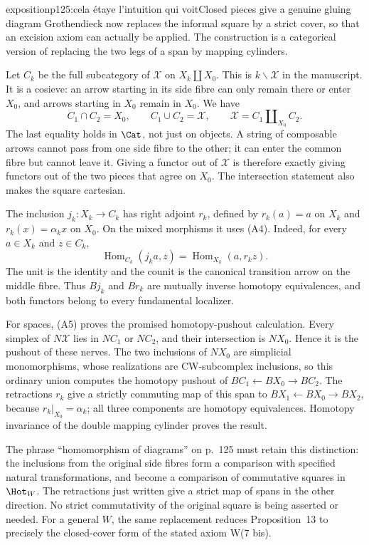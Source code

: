 \begin{dcomment}{exposition}{p125:cela étaye l'intuition qui voit}{Closed pieces give a genuine gluing diagram}
Grothendieck now replaces the informal square by a strict cover, so that an excision axiom can actually be applied.  The construction is a categorical version of replacing the two legs of a span by mapping cylinders.

Let $C_k$ be the full subcategory of $\mathcal X$ on $X_k\amalg X_0$.  This is $k\backslash\mathcal X$ in the manuscript.  It is a cosieve: an arrow starting in its side fibre can only remain there or enter $X_0$, and arrows starting in $X_0$ remain in $X_0$.  We have
\[
 C_1\cap C_2=X_0,\qquad C_1\cup C_2=\mathcal X,
 \qquad \mathcal X=C_1\amalg_{X_0}C_2.
 \tag{A5}
\]
The last equality holds in $\Cat$, not just on objects.  A string of composable arrows cannot pass from one side fibre to the other; it can enter the common fibre but cannot leave it.  Giving a functor out of $\mathcal X$ is therefore exactly giving functors out of the two pieces that agree on $X_0$.  The intersection statement also makes the square cartesian.

The inclusion $j_k:X_k\to C_k$ has right adjoint $r_k$, defined by $r_k(a)=a$ on $X_k$ and $r_k(x)=\alpha_kx$ on $X_0$.  On the mixed morphisms it uses (A4).  Indeed, for every $a\in X_k$ and $z\in C_k$,
\[
 \operatorname{Hom}_{C_k}(j_ka,z)
       =\operatorname{Hom}_{X_k}(a,r_kz).
\]
The unit is the identity and the counit is the canonical transition arrow on the middle fibre.  Thus $Bj_k$ and $Br_k$ are mutually inverse homotopy equivalences, and both functors belong to every fundamental localizer.

For spaces, (A5) proves the promised homotopy-pushout calculation.  Every simplex of $N\mathcal X$ lies in $NC_1$ or $NC_2$, and their intersection is $NX_0$.  Hence it is the pushout of these nerves.  The two inclusions of $NX_0$ are simplicial monomorphisms, whose realizations are CW-subcomplex inclusions, so this ordinary union computes the homotopy pushout of $BC_1\leftarrow BX_0\to BC_2$.  The retractions $r_k$ give a strictly commuting map of this span to $BX_1\leftarrow BX_0\to BX_2$, because $r_k|_{X_0}=\alpha_k$; all three components are homotopy equivalences.  Homotopy invariance of the double mapping cylinder proves the result.

The phrase ``homomorphism of diagrams'' on p.~125 must retain this distinction: the inclusions from the original side fibres form a comparison with specified natural transformations, and become a comparison of commutative squares in $\Hot_W$.  The retractions just written give a strict map of spans in the other direction.  No strict commutativity of the original square is being asserted or needed.  For a general $W$, the same replacement reduces Proposition~13 to precisely the closed-cover form of the stated axiom W(7 bis).
\end{dcomment}

